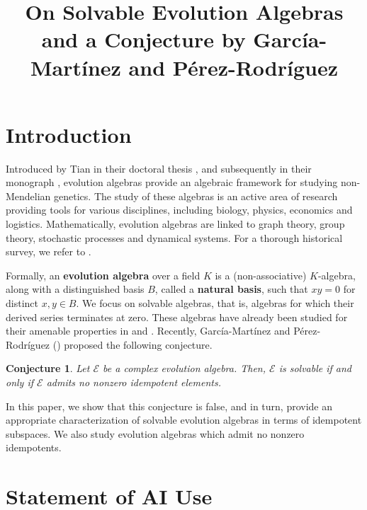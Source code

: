 \documentclass[11pt]{article}
\title[On Solvable Evolution Algebras]{On Solvable Evolution Algebras and a Conjecture by Garc\'ia-Mart\'inez and P\'erez-Rodr\'iguez}
\newtheorem{con}[thm]{Conjecture}
\theoremstyle{definition}
\numberwithin{equation}{section}
\begin{document}
\maketitle



\section{Introduction}

\begin{humanblock}

Introduced by Tian in their doctoral thesis \cite{thesisTian}, and subsequently in their monograph \cite{T08}, evolution algebras provide an algebraic framework for studying non-Mendelian genetics. The study of these algebras is an active area of research providing tools for various disciplines, including biology, physics, economics and logistics. Mathematically, evolution algebras are linked to graph theory, group theory, stochastic processes and dynamical systems. For a thorough historical survey, we refer to \cite{CFNT22}.

Formally, an \textbf{evolution algebra} over a field $K$ is a (non-associative) $K$-algebra, along with a distinguished basis $B$, called a \textbf{natural basis}, such that $xy = 0$ for distinct $x,y\in B$. We focus on solvable algebras, that is, algebras for which their derived series terminates at zero. These algebras have already been studied for their amenable properties in \cite{FGN22} and \cite{LPP25}. Recently, Garc\'ia-Mart\'inez and P\'erez-Rodr\'iguez (\cite{GP26}) proposed the following conjecture.




\begin{con}\label{theconjecture} Let $\mathcal E$ be a complex evolution algebra. Then, $\mathcal E$ is solvable if and only if $\mathcal E$ admits no nonzero idempotent elements.
\end{con}

In this paper, we show that this conjecture is false, and in turn, provide an appropriate characterization of solvable evolution algebras in terms of idempotent subspaces. We also study evolution algebras which admit no nonzero idempotents.
\end{humanblock}

\section*{Statement of AI Use}
\end{document}
